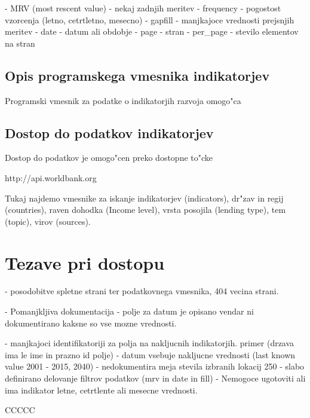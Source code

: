 - MRV (most rescent value) - nekaj zadnjih meritev
- frequency - pogostost vzorcenja (letno, cetrtletno, mesecno)
- gapfill - manjkajoce vrednosti prejsnjih meritev
- date - datum ali obdobje
- page - stran
- per\_page - stevilo elementov na stran








\subsection{Opis programskega vmesnika indikatorjev}


Programski vmesnik za podatke o indikatorjih razvoja omogo"ca 


\subsection{Dostop do podatkov indikatorjev}

Dostop do podatkov je omogo"cen preko dostopne to"cke

http://api.worldbank.org

Tukaj najdemo vmesnike za iskanje indikatorjev (indicators), dr"zav in regij
(countries), raven dohodka (Income level), vrsta posojila (lending type), tem
(topic), virov (sources).





\section{Tezave pri dostopu}

- posodobitve spletne strani ter podatkovnega vmesnika, 404 vecina strani.

- Pomanjkljiva dokumentacija
    - polje za datum je opisano vendar ni dokumentirano kaksne so vse mozne
      vrednosti. 

- manjkajoci identifikatoriji za polja na nakljucnih indikatorjih.
  primer (drzava ima le ime in prazno id polje)
- datum vsebuje nakljucne vrednosti (last known value 2001 - 2015, 2040)
- nedokumentira meja stevila izbranih lokacij 250
- slabo definirano delovanje filtrov podatkov (mrv in date in fill)
- Nemogoce ugotoviti ali ima indikator letne, cetrtlente ali mesecne vrednosti.



CCCCC
